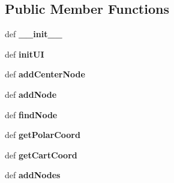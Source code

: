 \subsection*{Public Member Functions}
\begin{DoxyCompactItemize}
\item 
\hypertarget{classgroogleView_1_1GroogleView_a4b668e326a9e6c1a29cbecbb93e0a4c4}{def {\bfseries \-\_\-\-\_\-init\-\_\-\-\_\-}}\label{classgroogleView_1_1GroogleView_a4b668e326a9e6c1a29cbecbb93e0a4c4}

\item 
\hypertarget{classgroogleView_1_1GroogleView_a90eb678de84c6223b308ff84ca8557ea}{def {\bfseries init\-U\-I}}\label{classgroogleView_1_1GroogleView_a90eb678de84c6223b308ff84ca8557ea}

\item 
\hypertarget{classgroogleView_1_1GroogleView_abb3e85a4881f862299f9dfb5883a4085}{def {\bfseries add\-Center\-Node}}\label{classgroogleView_1_1GroogleView_abb3e85a4881f862299f9dfb5883a4085}

\item 
\hypertarget{classgroogleView_1_1GroogleView_af906304875a2e835b3d0f3ccc6ce1a5f}{def {\bfseries add\-Node}}\label{classgroogleView_1_1GroogleView_af906304875a2e835b3d0f3ccc6ce1a5f}

\item 
\hypertarget{classgroogleView_1_1GroogleView_a7eb89d332498ba8f533cb7db9d35d044}{def {\bfseries find\-Node}}\label{classgroogleView_1_1GroogleView_a7eb89d332498ba8f533cb7db9d35d044}

\item 
\hypertarget{classgroogleView_1_1GroogleView_aa243e8343c7fa0390d7447da7160af65}{def {\bfseries get\-Polar\-Coord}}\label{classgroogleView_1_1GroogleView_aa243e8343c7fa0390d7447da7160af65}

\item 
\hypertarget{classgroogleView_1_1GroogleView_a1905b78f3c6ddfa703d311939b7e76d7}{def {\bfseries get\-Cart\-Coord}}\label{classgroogleView_1_1GroogleView_a1905b78f3c6ddfa703d311939b7e76d7}

\item 
\hypertarget{classgroogleView_1_1GroogleView_a91a58db1dbe7b2bad081d9b7b361d2f2}{def {\bfseries add\-Nodes}}\label{classgroogleView_1_1GroogleView_a91a58db1dbe7b2bad081d9b7b361d2f2}

\end{DoxyCompactItemize}
